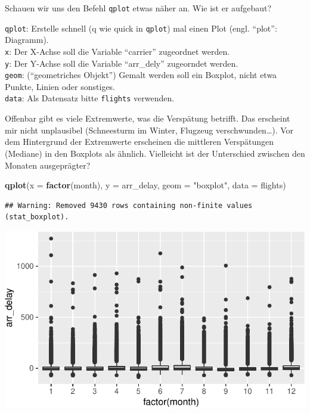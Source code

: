 \documentclass[12pt,ngerman,paper=a4,pagesize,DIV=13]{scrreprt}
\newenvironment{Shaded}{\begin{snugshade}}{\end{snugshade}}
\newcommand{\DataTypeTok}[1]{\textcolor[rgb]{0.13,0.29,0.53}{#1}}
\newcommand{\KeywordTok}[1]{\textcolor[rgb]{0.13,0.29,0.53}{\textbf{#1}}}
\newcommand{\NormalTok}[1]{#1}
\newcommand{\StringTok}[1]{\textcolor[rgb]{0.31,0.60,0.02}{#1}}
\begin{document}
Schauen wir uns den Befehl \texttt{qplot} etwas näher an. Wie ist er
aufgebaut?

\texttt{qplot}: Erstelle schnell (q wie quick in \texttt{qplot}) mal
einen Plot (engl. \enquote{plot}: Diagramm).\\
\texttt{x}: Der X-Achse soll die Variable \enquote{carrier} zugeordnet
werden.\\
\texttt{y}: Der Y-Achse soll die Variable \enquote{arr\_dely} zugeorndet
werden.\\
\texttt{geom}: (\enquote{geometriches Objekt}) Gemalt werden soll ein
Boxplot, nicht etwa Punkte, Linien oder sonstiges.\\
\texttt{data}: Als Datensatz bitte \texttt{flights} verwenden.

Offenbar gibt es viele Extremwerte, was die Verspätung betrifft. Das
erscheint mir nicht unplausibel (Schneesturm im Winter, Flugzeug
verschwunden\ldots{}). Vor dem Hintergrund der Extremwerte erscheinen
die mittleren Verspätungen (Mediane) in den Boxplots als ähnlich.
Vielleicht ist der Unterschied zwischen den Monaten ausgeprägter?

\begin{Shaded}
\begin{Highlighting}[]
\KeywordTok{qplot}\NormalTok{(}\DataTypeTok{x =} \KeywordTok{factor}\NormalTok{(month), }\DataTypeTok{y =}\NormalTok{ arr_delay, }\DataTypeTok{geom =} \StringTok{"boxplot"}\NormalTok{, }\DataTypeTok{data =}\NormalTok{ flights)}
\end{Highlighting}
\end{Shaded}

\begin{verbatim}
## Warning: Removed 9430 rows containing non-finite values (stat_boxplot).
\end{verbatim}

\includegraphics{DatenerhebungStatistik-Uebung_files/figure-latex/unnamed-chunk-237-1.pdf}
\end{document}

